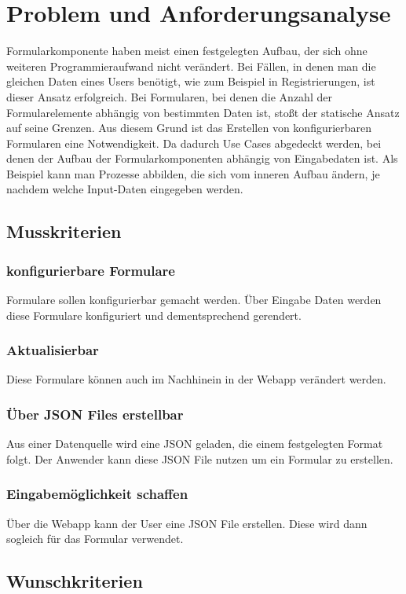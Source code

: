 \documentclass[a4paper,11pt]{scrreprt}
\begin{document}
\chapter{Problem und Anforderungsanalyse}
Formularkomponente haben meist einen festgelegten Aufbau, der sich ohne weiteren Programmieraufwand nicht verändert. Bei Fällen, in denen man die gleichen Daten eines Users benötigt, wie zum Beispiel in Registrierungen, ist dieser Ansatz erfolgreich. Bei Formularen, bei denen die Anzahl der Formularelemente abhängig von bestimmten Daten ist, stoßt der statische Ansatz auf seine Grenzen. Aus diesem Grund ist das Erstellen von konfigurierbaren Formularen eine Notwendigkeit. Da dadurch Use Cases abgedeckt werden, bei denen der Aufbau der Formularkomponenten abhängig von Eingabedaten ist. Als Beispiel kann man Prozesse abbilden, die sich vom inneren Aufbau ändern, je nachdem welche Input-Daten eingegeben werden.  


\section{Musskriterien}
\subsection{konfigurierbare Formulare}
Formulare sollen konfigurierbar gemacht werden. Über Eingabe Daten werden diese Formulare konfiguriert und dementsprechend gerendert.
\subsection{Aktualisierbar}
Diese Formulare können auch im Nachhinein in der Webapp verändert werden.
\subsection{Über JSON Files erstellbar}
Aus einer Datenquelle wird eine JSON geladen, die einem festgelegten Format folgt. Der Anwender kann diese JSON File nutzen um ein Formular zu erstellen. 
\subsection{Eingabemöglichkeit schaffen}
Über die Webapp kann der User eine JSON File erstellen. Diese wird dann sogleich für das Formular verwendet.

\section{Wunschkriterien}
\end{document}

